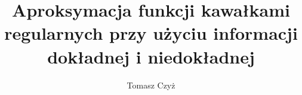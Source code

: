 \documentclass[oik, pdftex, man]{mgrwms}
\begin{document}
\title{ \LARGE Aproksymacja funkcji kawałkami regularnych przy użyciu informacji dokładnej i niedokładnej}
\author{Tomasz Czyż}
\maketitle

\renewcommand{\figurename}{Rys.}

\newtheorem{thm}{Twierdzenie}[chapter]
\newtheorem{lemma}[thm]{Lemat}
\newtheorem{stw}[thm]{Stwierdzenie}
\newtheorem{cor}[thm]{Wniosek}
\newtheorem{obs}[thm]{Obserwacja}
\newtheorem{uw}[thm]{Uwaga}
\newtheorem{df}[thm]{Definicja}
\newcommand{\E}{\mathbb{E}}
\newcommand{\R}{\mathbb{R}}
\newcommand{\Pra}{\mathbb{Pra}}
\newcommand{\F}{\mathcal{F}}
\newcommand{\1}{\mathbbm{1}}
\newcommand{\Galphabeta}{\mathcal{G}_{r,\varrho}([\alpha,\beta])}
\newcommand{\G}{\mathcal{G}_{r,\varrho}}
\newcommand{\wor}{\mathrm{wor}}
\newcommand{\reg}{\mathrm{reg}}
\newcommand{\cost}{\mathrm{cost}}
\newcommand{\comp}{\mathrm{comp}}
\newcommand{\po}{\hat{t}}

\makeatletter
\newcommand*{\defeq}{\mathrel{\rlap{%
                     \raisebox{0.3ex}{$\m@th\cdot$}}%
                     \raisebox{-0.3ex}{$\m@th\cdot$}}%
                     =}
\let\c@table\c@figure
\makeatother


\tableofcontents

\end{document}
